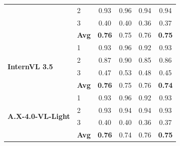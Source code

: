 \documentclass[11pt]{article}
\begin{document}
\begin{center}
\begin{tabular}{llcccc}
        & 2 & 0.93 & 0.96 & 0.94 & 0.94 \\
        & 3 & 0.40 & 0.40 & 0.36 & 0.37 \\
        & \textbf{Avg} & \textbf{0.76} & 0.75 & 0.76 & \textbf{0.75} \\
        \midrule
        \multirow{4}{*}{\textbf{InternVL 3.5}} & 1 & 0.93 & 0.96 & 0.92 & 0.93 \\
        & 2 & 0.87 & 0.90 & 0.85 & 0.86 \\
        & 3 & 0.47 & 0.53 & 0.48 & 0.45 \\
        & \textbf{Avg} & \textbf{0.76} & 0.75 & 0.76 & \textbf{0.74} \\
        \midrule
        \multirow{4}{*}{\textbf{A.X-4.0-VL-Light}} & 1 & 0.93 & 0.96 & 0.92 & 0.93 \\
        & 2 & 0.93 & 0.94 & 0.94 & 0.93 \\
        & 3 & 0.40 & 0.40 & 0.36 & 0.37 \\
        & \textbf{Avg} & \textbf{0.76} & 0.74 & 0.76 & \textbf{0.75} \\
        \bottomrule
    \end{tabular}
    \label{tab:results-english-detailed}
\end{center}

\vspace{2em} %
\end{document}
